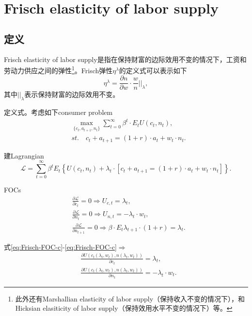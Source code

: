 \section{Frisch elasticity of labor supply}
\label{sec:Frish-elasticity}
\subsection{定义}
Frisch elasticity of labor supply是指在保持财富的边际效用不变的情况下，工资和劳动力供应之间的弹性\citep{Frisch:1932wk}\footnote{此外还有Marshallian elasticity of labor supply（保持收入不变的情况下），和Hicksian elasiticity of labor supply（保持效用水平不变的情况下）等。}。Frisch弹性$\eta^{\lambda}$的定义式可以表示如下
\begin{equation*}
  \eta^{\lambda} = \frac{\partial n}{\partial w} \cdot \frac{w}{n} ||_{\lambda},
\end{equation*}
其中$||_{\lambda}$表示保持财富的边际效用不变。

定义式。考虑如下consumer problem
\begin{align*}
  &\max_{\{c_t,a_{t+1},n_t\}} \sum_{t=0}^{\infty} \beta^t \cdot E_t U(c_t,n_t), \\
    &st. \quad c_t + a_{t+1} = (1+r) \cdot a_t + w_t \cdot n_t.
\end{align*}

建Lagrangian
\begin{equation*}
  \mathcal{L} = \sum_{t=0}^{\infty} \beta^t E_t \left\{U(c_t,n_t) + \lambda_t \cdot \left[c_t + a_{t+1} = (1+r) \cdot a_t + w_t \cdot n_t \right]\right\} .
\end{equation*}

FOCs
\begin{align}
\label{eq:Frisch-FOC-c}
  &\frac{\partial \mathcal{L}}{\partial c_t}=0 \Rightarrow U_{c,t}=\lambda_t,\\
\label{eq:Frisch-FOC-n}
  &\frac{\partial \mathcal{L}}{\partial n_t}=0 \Rightarrow U_{n,t}=-\lambda_t \cdot w_t,\\
\label{eq:Frisch-FOC-a}
  &\frac{\partial \mathcal{L}}{\partial a_{t+1}}=0 \Rightarrow \beta \cdot E_t \lambda_{t+1} \cdot (1+r) =\lambda_t.
\end{align}

式\eqref{eq:Frisch-FOC-c}-\eqref{eq:Frisch-FOC-c}$\Rightarrow$
\begin{align}
\label{eq:Frisch-FOC-c-lambda-w}
  &\frac{\partial U(c_t(\lambda_t, w_t),n(\lambda_t, w_t))}{\partial c_t} = \lambda_t,\\
\label{eq:Frisch-FOC-n-lambda-w}
  &\frac{\partial U(c_t(\lambda_t, w_t),n(\lambda_t, w_t))}{\partial n_t} = -\lambda_t \cdot w_t.
\end{align}

